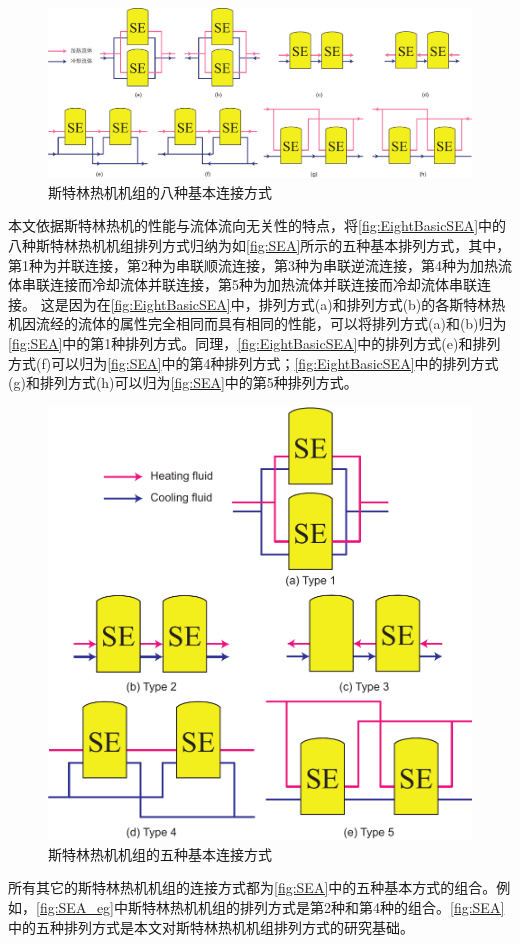 \begin{figure}[htbp]
	\centering
	\includegraphics[width = 0.9\columnwidth]{fig/EightBasicSEA}
	\caption{斯特林热机机组的八种基本连接方式}
	\label{fig:EightBasicSEA}
\end{figure}

本文依据斯特林热机的性能与流体流向无关性的特点，将\autoref{fig:EightBasicSEA}中的八种斯特林热机机组排列方式归纳为如\autoref{fig:SEA}所示的五种基本排列方式，其中，第1种为并联连接，第2种为串联顺流连接，第3种为串联逆流连接，第4种为加热流体串联连接而冷却流体并联连接，第5种为加热流体并联连接而冷却流体串联连接。
这是因为在\autoref{fig:EightBasicSEA}中，排列方式(a)和排列方式(b)的各斯特林热机因流经的流体的属性完全相同而具有相同的性能，可以将排列方式(a)和(b)归为\autoref{fig:SEA}中的第1种排列方式。同理，\autoref{fig:EightBasicSEA}中的排列方式(e)和排列方式(f)可以归为\autoref{fig:SEA}中的第4种排列方式；\autoref{fig:EightBasicSEA}中的排列方式(g)和排列方式(h)可以归为\autoref{fig:SEA}中的第5种排列方式。

\begin{figure}[htbp]
\centering
	\includegraphics[width = 0.45\columnwidth]{fig/BasicSEA}
	\caption{斯特林热机机组的五种基本连接方式}
	\label{fig:SEA}
\end{figure}

所有其它的斯特林热机机组的连接方式都为\autoref{fig:SEA}中的五种基本方式的组合。例如，\autoref{fig:SEA_eg}中斯特林热机机组的排列方式是第2种和第4种的组合。\autoref{fig:SEA}中的五种排列方式是本文对斯特林热机机组排列方式的研究基础。


